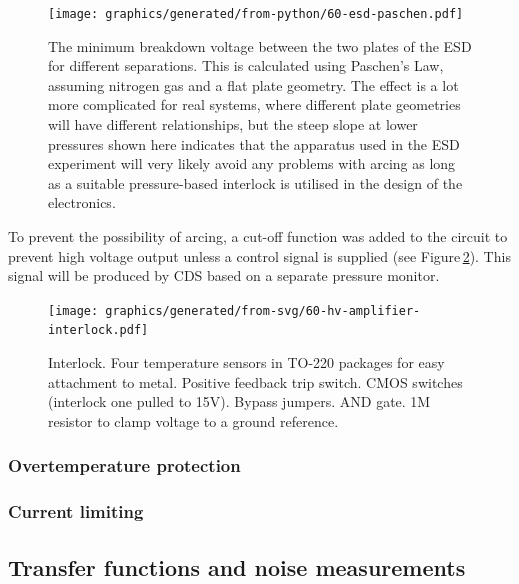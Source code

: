 \begin{figure}
  \centering
  \texttt{[image: graphics/generated/from-python/60-esd-paschen.pdf]}
  \caption[Minimum breakdown voltage between the two plates of the electrostatic drive for different separations]{\label{fig:esd-paschen}The minimum breakdown voltage between the two plates of the \gls{ESD} for different separations. This is calculated using Paschen's Law, assuming nitrogen gas and a flat plate geometry. The effect is a lot more complicated for real systems, where different plate geometries will have different relationships, but the steep slope at lower pressures shown here indicates that the apparatus used in the \gls{ESD} experiment will very likely avoid any problems with arcing as long as a suitable pressure-based interlock is utilised in the design of the electronics.}
\end{figure}

To prevent the possibility of arcing, a cut-off function was added to the circuit to prevent high voltage output unless a control signal is supplied (see Figure\,\ref{fig:hv-amp-interlock}). This signal will be produced by \gls{CDS} based on a separate pressure monitor.


\begin{figure}
  \centering
  \texttt{[image: graphics/generated/from-svg/60-hv-amplifier-interlock.pdf]}
  \caption[High voltage amplifier interlock schematic]{\label{fig:hv-amp-interlock}Interlock. Four temperature sensors in TO-220 packages for easy attachment to metal. Positive feedback trip switch. CMOS switches (interlock one pulled to 15V). Bypass jumpers. AND gate. 1M resistor to clamp voltage to a ground reference.}
\end{figure}

\subsubsection{Overtemperature protection}

\subsubsection{Current limiting}

\subsection{Transfer functions and noise measurements}

